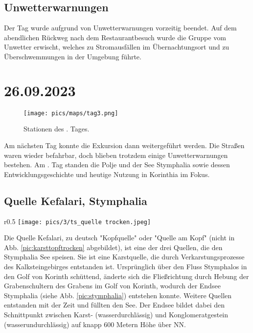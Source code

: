 \documentclass[preprint]{geomorphica} %
\begin{document}
\subsection{Unwetterwarnungen}

Der Tag wurde aufgrund von Unwetterwarnungen vorzeitig beendet. Auf dem abendlichen Rückweg nach dem Restaurantbesuch wurde die Gruppe vom Unwetter erwischt, welches zu Stromausfällen im Übernachtungsort und zu Überschwemmungen in der Umgebung führte.


\newpage

\section{26.09.2023}

\begin{figure}[!h]
    \centering
    \texttt{[image: pics/maps/tag3.png]}
    \caption{Stationen des \theday. Tages.}
    \label{pic:tag3}
\end{figure}

Am nächsten Tag konnte die Exkursion dann weitergeführt werden. Die Straßen waren wieder befahrbar, doch blieben trotzdem einige Unwetterwarnungen bestehen.
Am \theday. Tag standen die Polje und der See Stymphalia sowie dessen Entwicklungsgeschichte und heutige Nutzung in Korinthia im Fokus.

\subsection{Quelle Kefalari, Stymphalia}

\begin{wrapfigure}{r}{0.5\textwidth}
    \centering
    \texttt{[image: pics/3/ts\_quelle trocken.jpeg]}
    \caption{Der sich im Dorf Stymphalia befindende Karsttopf, hier trocken [Foto: Tabea Storch].}
    \label{pic:karsttopftrocken}
\end{wrapfigure}

Die Quelle Kefalari, zu deutsch "Kopfquelle" oder "Quelle am Kopf" (nicht in Abb. \ref{pic:karsttopftrocken} abgebildet), ist eine der drei Quellen, die den Stymphalia See speisen. Sie ist eine Karstquelle, die durch Verkarstungsprozesse des Kalksteingebirges entstanden ist. Ursprünglich über den Fluss Stymphalos in den Golf von Korinth schüttend, änderte sich die Fließrichtung durch Hebung der Grabenschultern des Grabens im Golf von Korinth, wodurch der Endsee Stymphalia (siehe Abb. \ref{pic:stymphalia}) entstehen konnte. Weitere Quellen entstanden mit der Zeit und füllten den See. Der Endsee bildet dabei den Schnittpunkt zwischen Karst- (wasserdurchlässig) und Konglomeratgestein (wasserundurchlässig) auf knapp 600 Metern Höhe über NN.
\end{document}
